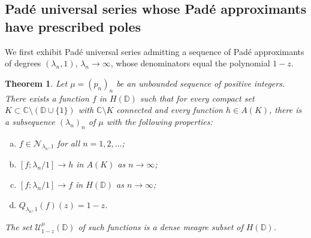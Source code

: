 \documentclass[12pt]{amsart}
\numberwithin{equation}{section}
\newtheorem{theorem}{Theorem}[section]
\begin{document}
\subsection{Pad\'e universal series whose Pad\'e approximants have prescribed poles}

We first exhibit Pad\'e universal series admitting a sequence of Pad\'e approximants of degrees $(\lambda_{n},1)$, $\lambda_{n}\to\infty$, whose denominators equal the polynomial
$1-z$.
\begin{theorem}\label{main-thm}
Let $\mu=\left(p_n\right)_n$ be an unbounded sequence of positive integers. There exists a function $f$
in $H({\mathbb D})$ such that for every compact set $K\subset {\mathbb{C}} \setminus ({\mathbb D}\cup\{1\})$ with ${\mathbb{C}} \setminus K$ connected and every function $h\in A(K)$, there is a subsequence $\left(\lambda_n\right)_n$ of $\mu$ with the following properties:
\begin{enumerate}[a)]
\item $f \in {\mathcal N}_{\lambda_n,1}$ for all $n=1,2,\ldots$;
\item $[f;\lambda_n/1]\rightarrow h$ in $A(K)$ as $n\rightarrow \infty$;
\item $[f;\lambda_n/1]\rightarrow f$ in $H({\mathbb D})$ as $n\rightarrow \infty$;
\item $Q_{\lambda_n,1}(f)(z)=1-z$.
\end{enumerate}
The set ${\mathcal U}_{1-z}^{\mu}({\mathbb D})$ of such functions is a dense meagre subset of $H({\mathbb D})$.
\end{theorem}
\end{document}
